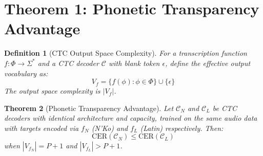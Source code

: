\documentclass[11pt]{article}
\newtheorem{theorem}{Theorem}
\newtheorem{definition}[theorem]{Definition}
\theoremstyle{remark}
\begin{document}
\section{Theorem 1: Phonetic Transparency Advantage}

\begin{definition}[CTC Output Space Complexity]
For a transcription function $f: \Phi \to \Sigma^*$ and a CTC decoder $\mathcal{C}$ with blank token $\epsilon$, define the effective output vocabulary as:
$$V_f = \{f(\phi) : \phi \in \Phi\} \cup \{\epsilon\}$$
The output space complexity is $|V_f|$.
\end{definition}

\begin{theorem}[Phonetic Transparency Advantage]
Let $\mathcal{C}_N$ and $\mathcal{C}_L$ be CTC decoders with identical architecture and capacity, trained on the same audio data with targets encoded via $f_N$ (N'Ko) and $f_L$ (Latin) respectively. Then:
$$\text{CER}(\mathcal{C}_N) \leq \text{CER}(\mathcal{C}_L)$$
when $|V_{f_N}| = P + 1$ and $|V_{f_L}| > P + 1$.
\end{theorem}
\end{document}

